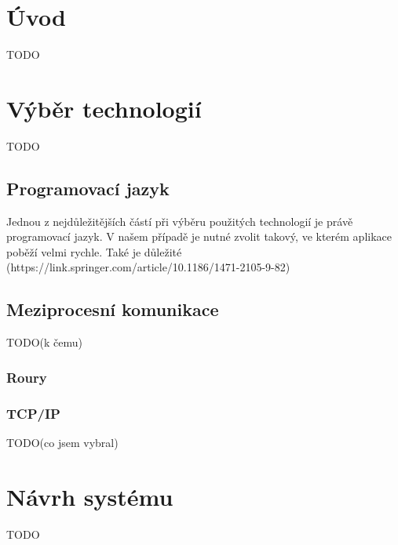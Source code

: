 \chapter{Úvod}
TODO

\chapter{Výběr technologií}
TODO
\section{Programovací jazyk}
Jednou z nejdůležitějších částí při výběru použitých technologií je právě programovací jazyk. V našem případě je nutné zvolit takový, ve kterém aplikace poběží velmi rychle. Také je důležité (https://link.springer.com/article/10.1186/1471-2105-9-82)

\section{Meziprocesní komunikace}
TODO(k čemu)
\subsection{Roury}
\subsection{TCP/IP}
TODO(co jsem vybral)



\chapter{Návrh systému}
TODO


